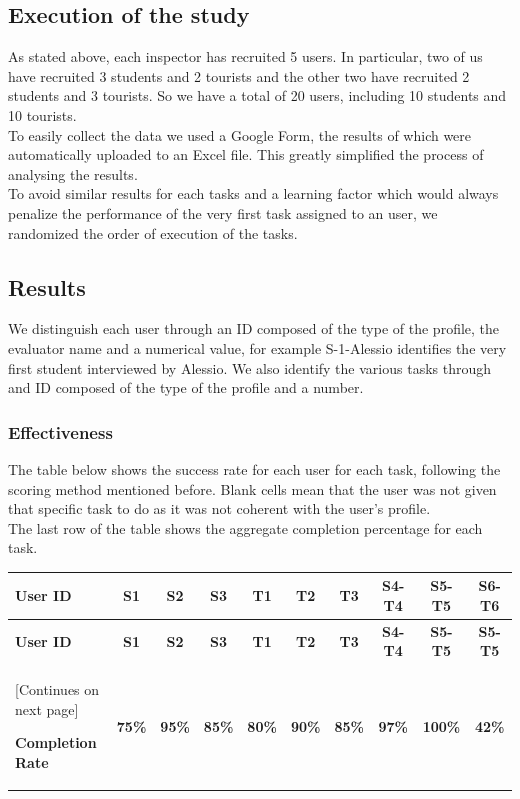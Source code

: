 \subsection{Execution of the study}
    As stated above, each inspector has recruited 5 users. In particular, two of us have recruited 3 students and 2 tourists and the other two have recruited 2 students and 3 tourists. So we have a total of 20 users, including 10 students and 10 tourists.\\
    To easily collect the data we used a Google Form, the results of which were automatically uploaded to an Excel file. This greatly simplified the process of analysing the results.\\
    To avoid similar results for each tasks and a learning factor which would always penalize the performance of the very first task assigned to an user, we randomized the order of execution of the tasks.

\subsection{Results}

    We distinguish each user through an ID composed of the type of the profile, the evaluator name and a numerical value, for example S-1-Alessio identifies the very first student interviewed by Alessio. We also identify the various tasks through and ID composed of the type of the profile and a number.
\subsubsection{Effectiveness}
    The table below shows the success rate for each user for each task, following the scoring method mentioned before. Blank cells mean that the user was not given that specific task to do as it was not coherent with the user's profile.\\
    The last row of the table shows the aggregate completion percentage for each task.
    \begin{tabularx}{\linewidth}{l|c|c|c|c|c|c|c|c|c}
    \toprule
    \textbf{User ID} & \textbf{S1} & \textbf{S2} & \textbf{S3} & \textbf{T1} & \textbf{T2} & \textbf{T3} & \textbf{S4-T4} & \textbf{S5-T5} & \textbf{S6-T6} \\
    \midrule
    \endfirsthead
    \toprule
    \textbf{User ID} & \textbf{S1} & \textbf{S2} & \textbf{S3} & \textbf{T1} & \textbf{T2} & \textbf{T3} & \textbf{S4-T4} & \textbf{S5-T5} & \textbf{S5-T5} \\
    \hline
    \endhead
    \midrule
    \footnotesize [Continues on next page]
    \endfoot
    \bottomrule
    \endlastfoot

        \textbf{Completion Rate} & \textbf{75\%} & \textbf{95\%} & \textbf{85\%} & \textbf{80\%} & \textbf{90\%} & \textbf{85\%} & \textbf{97\%} & \textbf{100\%} & \textbf{42\%}
    \end{tabularx}


